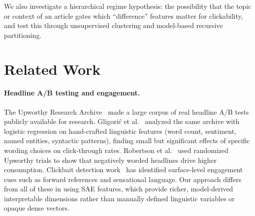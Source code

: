 \documentclass[sigconf,natbib=false, language=english]{acmart}
\begin{document}
We also investigate a hierarchical regime hypothesis: the possibility that the topic or context of an article gates which ``difference'' features matter for clickability, and test this through unsupervised clustering and model-based recursive partitioning.


\section{Related Work}

\paragraph{Headline A/B testing and engagement.}
The Upworthy Research Archive~\cite{matias2021upworthy} made a large corpus of real headline A/B tests publicly available for research. Gligori\'{c} et al.~\cite{gligoric2023linguistic} analyzed the same archive with logistic regression on hand-crafted linguistic features (word count, sentiment, named entities, syntactic patterns), finding small but significant effects of specific wording choices on click-through rates. Robertson et al.~\cite{robertson2023negativity} used randomized Upworthy trials to show that negatively worded headlines drive higher consumption. Clickbait detection work~\cite{chakraborty2016stop} has identified surface-level engagement cues such as forward references and sensational language. Our approach differs from all of these in using SAE features, which provide richer, model-derived interpretable dimensions rather than manually defined linguistic variables or opaque dense vectors.
\end{document}
